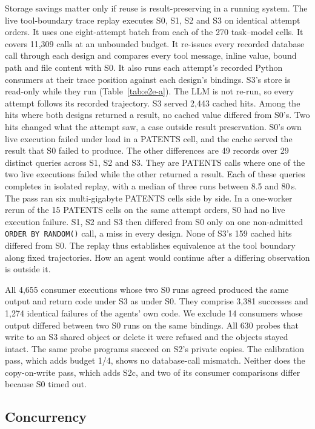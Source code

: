 Storage savings matter only if reuse is result-preserving in a running system. The live tool-boundary trace replay executes S0, S1, S2 and S3 on identical attempt orders. It uses one eight-attempt batch from each of the 270 task--model cells. It covers 11,309 calls at an unbounded budget. It re-issues every recorded database call through each design
and compares every tool message, inline value, bound path and file content with S0. It also runs each attempt's
recorded Python consumers at their trace position against each design's bindings. S3's store is read-only while they
run (Table~\ref{tab:e2e-a}). The LLM is not re-run, so every attempt follows its recorded trajectory. S3 served
2,443 cached hits. Among the hits where both designs returned a result, no cached value differed from S0's. Two
hits changed what the attempt saw, a case outside result preservation. S0's own live execution failed under load in a PATENTS cell,
and the cache served the result that S0 failed to produce. The other differences are 49 records over 29 distinct
queries across S1, S2 and S3. They are PATENTS calls where one of the two live executions failed while the other
returned a result. Each of these queries completes in isolated replay, with a median of three runs between 8.5 and
80\,s. The pass ran six multi-gigabyte PATENTS cells side by side. In a one-worker rerun of the 15 PATENTS cells on
the same attempt orders, S0 had no live execution failure. S1, S2 and S3 then differed from S0 only on one
non-admitted \texttt{ORDER BY RANDOM()} call, a miss in every design. None of S3's 159 cached hits differed from S0.
The replay thus establishes equivalence at the tool boundary along fixed trajectories. How an agent would continue
after a differing observation is outside it.

All 4,655 consumer executions whose two S0 runs agreed produced the same output and return code under S3 as under
S0. They comprise 3,381 successes and 1,274 identical failures of the agents' own code. We exclude 14 consumers
whose output differed between two S0 runs on the same bindings. All 630 probes that write to an S3 shared object or
delete it were refused and the objects stayed intact. The same probe programs succeed on S2's private copies. The
calibration pass, which adds budget 1/4, shows no database-call mismatch. Neither does the copy-on-write pass, which
adds S2c, and two of its consumer comparisons differ because S0 timed out.

\subsection{Concurrency}
\label{sec:concurrency}

